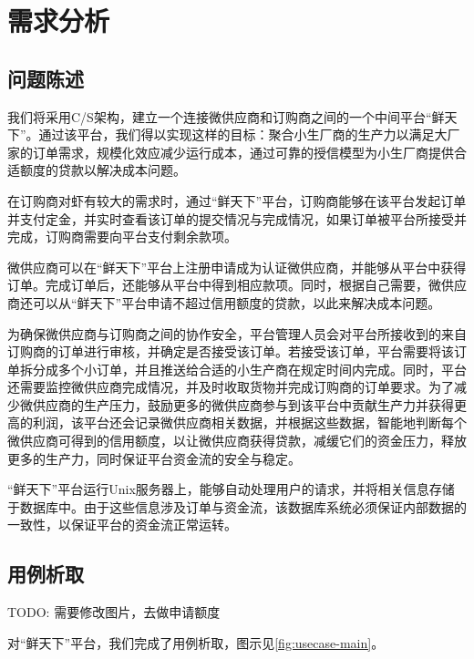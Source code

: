 \chapter{需求分析}
\label{cha:demand_analysis}
\section{问题陈述}

我们将采用C/S架构，建立一个连接微供应商和订购商之间的一个中间平台“鲜天下”。通过该平台，我们得以实现这样的目标：聚合小生厂商的生产力以满足大厂家的订单需求，规模化效应减少运行成本，通过可靠的授信模型为小生厂商提供合适额度的贷款以解决成本问题。

在订购商对虾有较大的需求时，通过“鲜天下”平台，订购商能够在该平台发起订单并支付定金，并实时查看该订单的提交情况与完成情况，如果订单被平台所接受并完成，订购商需要向平台支付剩余款项。

微供应商可以在“鲜天下”平台上注册申请成为认证微供应商，并能够从平台中获得订单。完成订单后，还能够从平台中得到相应款项。同时，根据自己需要，微供应商还可以从“鲜天下”平台申请不超过信用额度的贷款，以此来解决成本问题。

为确保微供应商与订购商之间的协作安全，平台管理人员会对平台所接收到的来自订购商的订单进行审核，并确定是否接受该订单。若接受该订单，平台需要将该订单拆分成多个小订单，并且推送给合适的小生产商在规定时间内完成。同时，平台还需要监控微供应商完成情况，并及时收取货物并完成订购商的订单要求。为了减少微供应商的生产压力，鼓励更多的微供应商参与到该平台中贡献生产力并获得更高的利润，该平台还会记录微供应商相关数据，并根据这些数据，智能地判断每个微供应商可得到的信用额度，以让微供应商获得贷款，减缓它们的资金压力，释放更多的生产力，同时保证平台资金流的安全与稳定。

“鲜天下”平台运行Unix服务器上，能够自动处理用户的请求，并将相关信息存储于数据库中。由于这些信息涉及订单与资金流，该数据库系统必须保证内部数据的一致性，以保证平台的资金流正常运转。


\section{用例析取}

TODO: 需要修改图片，去做申请额度

对“鲜天下”平台，我们完成了用例析取，图示见\autoref{fig:usecase-main}。

